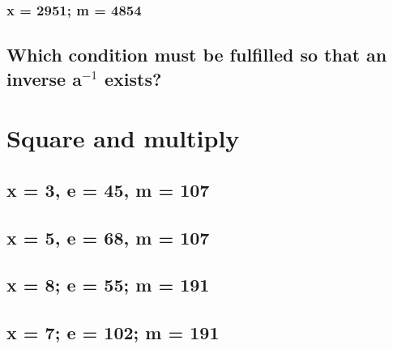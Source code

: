 \subsubsection{x = 2951; m = 4854}
\label{sec:4ad}

\subsection{Which condition must be fulfilled so that an inverse a$^{-1}$ exists?}
\label{sec:4b}

\newpage

\section{Square and multiply}

\subsection{x = 3, e = 45, m = 107}
\label{sec:5a}

\subsection{x = 5, e = 68, m = 107}
\label{sec:5b}

\subsection{x = 8; e = 55; m = 191}
\label{sec:5c}

\subsection{x = 7; e = 102; m = 191}
\label{sec:5d}
